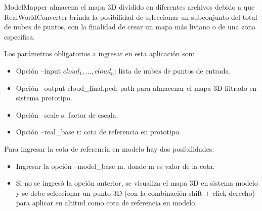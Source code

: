 ModelMapper almacena el mapa 3D dividido en diferentes archivos debido a que RealWorldConverter brinda la posibilidad de seleccionar un subconjunto del total de nubes de puntos, con la finalidad de crear un mapa más liviano o de una zona específica. 

Los parámetros obligatorios a ingresar en esta aplicación son:

\begin{itemize}
\item Opción --input $ cloud_{1}, ..., cloud_{n} $: lista de nubes de puntos de entrada.

\item Opción --output cloud\_final.pcd: path para almacenar el mapa 3D filtrado en sistema prototipo.

\item Opción --scale s: factor de escala.

\item Opción --real\_base r: cota de referencia en prototipo.

\end{itemize}

Para ingresar la cota de referencia en modelo hay dos posibilidades: 
\begin{itemize}

\item Ingresar la opción --model\_base m, donde m es valor de la cota.

\item Si no se ingresó la opción anterior, se visualiza el mapa 3D en sistema modelo y se debe seleccionar un punto 3D (con la combinación shift + click derecho) para aplicar su altitud como cota de referencia en modelo.

\end{itemize}


